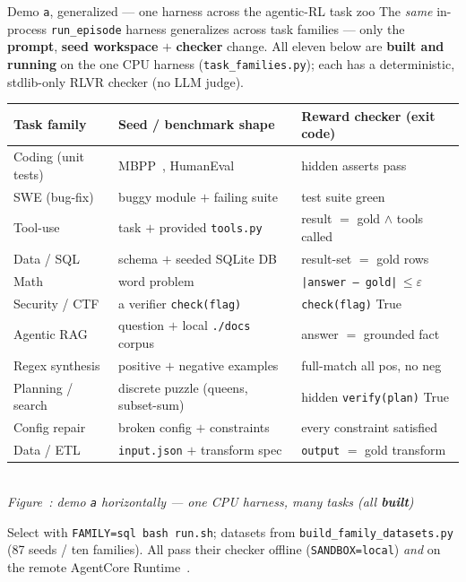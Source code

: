 \documentclass[aspectratio=169]{beamer}
\newcounter{deckfig}
\newcommand{\figtag}[1]{\refstepcounter{deckfig}%
  {\scriptsize\itshape Figure~\thedeckfig: #1}}
\begin{document}
\begin{frame}{Demo \texttt{a}, generalized --- one harness across the agentic-RL task zoo}
  \footnotesize The \emph{same} in-process \texttt{run\_episode} harness generalizes across task
  families --- only the \textbf{prompt}, \textbf{seed workspace} $+$ \textbf{checker} change. All
  eleven below are \textbf{built and running} on the one CPU harness (\texttt{task\_families.py});
  each has a deterministic, stdlib-only RLVR checker (no LLM judge).
  \begin{center}
  \renewcommand{\arraystretch}{0.66}\scriptsize
  \begin{tabular}{@{}p{2.4cm}p{4.1cm}p{4.4cm}@{}}
    \toprule
    \textbf{Task family} & \textbf{Seed / benchmark shape} & \textbf{Reward checker (exit code)} \\
    \midrule
    Coding (unit tests) & MBPP~\cite{mbpp}, HumanEval & hidden asserts pass \\
    SWE (bug-fix) & buggy module $+$ failing suite~\cite{swebench,swegym} & test suite green \\
    Tool-use & task $+$ provided \texttt{tools.py} & result $=$ gold $\wedge$ tools called \\
    Data / SQL & schema $+$ seeded SQLite DB & result-set $=$ gold rows \\
    Math & word problem & \texttt{|answer\,--\,gold|}\,$\le\varepsilon$ \\
    Security / CTF & a verifier \texttt{check(flag)} & \texttt{check(flag)} True \\
    Agentic RAG & question $+$ local \texttt{./docs} corpus & answer $=$ grounded fact \\
    Regex synthesis & positive $+$ negative examples & full-match all pos, no neg \\
    Planning / search & discrete puzzle (queens, subset-sum) & hidden \texttt{verify(plan)} True \\
    Config repair & broken config $+$ constraints & every constraint satisfied \\
    Data / ETL & \texttt{input.json} $+$ transform spec & \texttt{output} $=$ gold transform \\
    \bottomrule
  \end{tabular}
  \\[0.1em]\figtag{demo \texttt{a} horizontally --- one CPU harness, many tasks (all \textbf{built})}
  \end{center}
  \vspace{-0.2em}
  {\scriptsize Select with \texttt{FAMILY=sql bash run.sh}; datasets from \texttt{build\_family\_datasets.py}
  (87 seeds / ten families). All pass their checker offline (\texttt{SANDBOX=local}) \emph{and} on the
  remote AgentCore Runtime~\cite{deepseekr1,qwen3,kimik2}.}
\end{frame}
\end{document}
